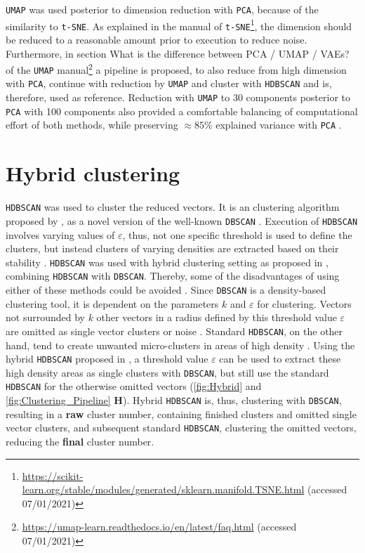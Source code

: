 \vspace{1em}

\texttt{UMAP} was used posterior to dimension reduction with \texttt{PCA}, because of the similarity to \texttt{t-SNE}. As explained in the manual of \texttt{t-SNE}\footnote{\url{https://scikit-learn.org/stable/modules/generated/sklearn.manifold.TSNE.html} (accessed 07/01/2021)}, the dimension should be reduced to a reasonable amount prior to execution to reduce noise. Furthermore, in section \glqq What is the difference between PCA / UMAP / VAEs?\grqq{} of the \texttt{UMAP} manual\footnote{\url{https://umap-learn.readthedocs.io/en/latest/faq.html} (accessed 07/01/2021)} a pipeline is proposed, to also reduce from high dimension with \texttt{PCA}, continue with reduction by \texttt{UMAP} and cluster with \texttt{HDBSCAN} and is, therefore, used as reference. Reduction with \texttt{UMAP} to 30 components posterior to \texttt{PCA} with 100 components also provided a comfortable balancing of computational effort of both methods, while preserving $\approx 85\%$ explained variance with \texttt{PCA} \autocite{mcinnes_umap_2020}. 

\section{Hybrid clustering} \label{sec:HDBSCAN}

\texttt{HDBSCAN} was used to cluster the reduced vectors. It is an clustering algorithm proposed by \textcite{campello_hierarchical_2015}, as a novel version of the well-known \texttt{DBSCAN} \autocite{hutchison_density-based_2013}. Execution of \texttt{HDBSCAN} involves varying values of $\varepsilon$, thus, not one specific threshold is used to define the clusters, but instead clusters of varying densities are extracted based on their stability \autocite{mcinnes_hdbscan_2017}. \texttt{HDBSCAN} was used with hybrid clustering setting as proposed in \textcite{malzer_hybrid_2020}, combining \texttt{HDBSCAN} with \texttt{DBSCAN}. Thereby, some of the disadvantages of using either of these methods could be avoided \autocite{mcinnes_hdbscan_2017, moulavi_density-based_2014}. Since \texttt{DBSCAN} is a density-based clustering tool, it is dependent on the parameters $k$ and $\varepsilon$ for clustering. Vectors not surrounded by $k$ other vectors in a radius defined by this threshold value $\varepsilon$ are omitted as single vector clusters or noise \autocite{ester_density-based_1996, schubert_dbscan_2017}. Standard \texttt{HDBSCAN}, on the other hand, tend to create unwanted micro-clusters in areas of high density \autocite{mcinnes_hdbscan_2017}. Using the hybrid \texttt{HDBSCAN} proposed in \autocite{malzer_hybrid_2020}, a threshold value $\varepsilon$ can be used to extract these high density areas as single clusters with \texttt{DBSCAN}, but still use the standard \texttt{HDBSCAN} for the otherwise omitted vectors (\autoref{fig:Hybrid} and \autoref{fig:Clustering_Pipeline} \textsf{\textbf{H}}). Hybrid \texttt{HDBSCAN} is, thus, clustering with \texttt{DBSCAN}, resulting in a \textbf{raw} cluster number, containing finished clusters and omitted single vector clusters, and subsequent standard \texttt{HDBSCAN}, clustering the omitted vectors, reducing the \textbf{final} cluster number.

